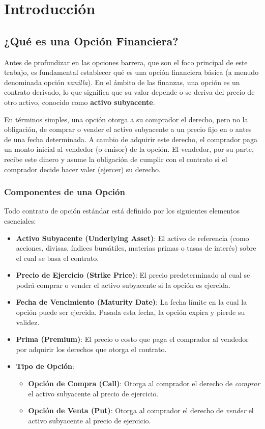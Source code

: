 \chapter{Introducción}
\label{chapter:intro}

\section{¿Qué es una Opción Financiera?}

Antes de profundizar en las opciones barrera, que son el foco principal de este trabajo, es fundamental establecer qué es una opción financiera básica (a menudo denominada opción \textit{vanilla}). En el ámbito de las finanzas, una opción es un contrato derivado, lo que significa que su valor depende o se deriva del precio de otro activo, conocido como \textbf{activo subyacente}.

En términos simples, una opción otorga a su comprador el derecho, pero no la obligación, de comprar o vender el activo subyacente a un precio fijo en o antes de una fecha determinada. A cambio de adquirir este derecho, el comprador paga un monto inicial al vendedor (o emisor) de la opción. El vendedor, por su parte, recibe este dinero y asume la obligación de cumplir con el contrato si el comprador decide hacer valer (ejercer) su derecho.

\subsection{Componentes de una Opción}

Todo contrato de opción estándar está definido por los siguientes elementos esenciales:

\begin{itemize}
    \item \textbf{Activo Subyacente (Underlying Asset)}: El activo de referencia (como acciones, divisas, índices bursátiles, materias primas o tasas de interés) sobre el cual se basa el contrato.
    \item \textbf{Precio de Ejercicio (Strike Price)}: El precio predeterminado al cual se podrá comprar o vender el activo subyacente si la opción es ejercida.
    \item \textbf{Fecha de Vencimiento (Maturity Date)}: La fecha límite en la cual la opción puede ser ejercida. Pasada esta fecha, la opción expira y pierde su validez.
    \item \textbf{Prima (Premium)}: El precio o costo que paga el comprador al vendedor por adquirir los derechos que otorga el contrato.
    \item \textbf{Tipo de Opción}:
    \begin{itemize}
        \item \textbf{Opción de Compra (Call)}: Otorga al comprador el derecho de \textit{comprar} el activo subyacente al precio de ejercicio.
        \item \textbf{Opción de Venta (Put)}: Otorga al comprador el derecho de \textit{vender} el activo subyacente al precio de ejercicio.
    \end{itemize}
\end{itemize}

